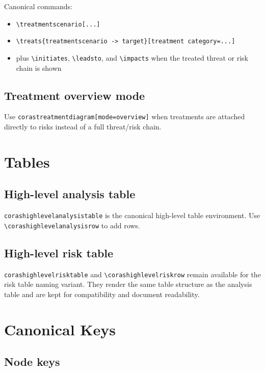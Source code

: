 \documentclass[a4paper]{article}
\begin{document}
Canonical commands:

\begin{itemize}
  \item \texttt{\textbackslash treatmentscenario[...]}
  \item \texttt{\textbackslash treats\{treatmentscenario -> target\}[treatment category=...]}
  \item plus \texttt{\textbackslash initiates}, \texttt{\textbackslash leadsto}, and
    \texttt{\textbackslash impacts} when the treated threat or risk chain is shown
\end{itemize}

\subsection{Treatment overview mode}

Use \texttt{corastreatmentdiagram[mode=overview]} when treatments are attached
directly to risks instead of a full threat/risk chain.

\section{Tables}

\subsection{High-level analysis table}

\texttt{corashighlevelanalysistable} is the canonical high-level table
environment. Use \texttt{\textbackslash corashighlevelanalysisrow} to add rows.

\subsection{High-level risk table}

\texttt{corashighlevelrisktable} and
\texttt{\textbackslash corashighlevelriskrow} remain available for the risk
table naming variant. They render the same table structure as the analysis
table and are kept for compatibility and document readability.

\section{Canonical Keys}

\subsection{Node keys}
\end{document}
